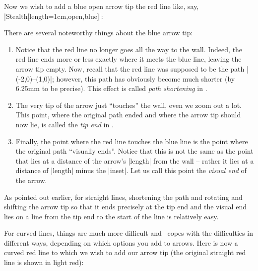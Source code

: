 Now we wish to add a blue open arrow tip the red line like, say,
|Stealth[length=1cm,open,blue]|:
%
\begin{codeexample}
\usetikzlibrary{patterns}
\def\wall{ \fill     [fill=black!50]  (1,-.5) rectangle (2,.5);
           \pattern  [pattern=bricks] (1,-.5) rectangle (2,.5);
           \draw     [line width=1pt]  (1cm+.5pt,-.5) -- ++(0,1); }
\end{codeexample}
\begin{codeexample}[]
\end{codeexample}

There are several noteworthy things about the blue arrow tip:
%
\begin{enumerate}
    \item Notice that the red line no longer goes all the way to the wall.
        Indeed, the red line ends more or less exactly where it meets the
        blue line, leaving the arrow tip empty. Now, recall that the red line
        was supposed to be the path |(-2,0)--(1,0)|; however, this path has
        obviously become much shorter (by 6.25mm to be precise). This effect
        is called \emph{path shortening} in \tikzname.
    \item The very tip of the arrow just ``touches'' the wall, even we zoom
        out a lot. This point, where the original path ended and where the
        arrow tip should now lie, is called the \emph{tip end} in \tikzname.
    \item Finally, the point where the red line touches the blue line is the
        point where the original path ``visually ends''. Notice that this is
        not the same as the point that lies at a distance of the arrow's
        |length| from the wall -- rather it lies at a distance of |length|
        minus the |inset|. Let us call this point the \emph{visual
    end} of the arrow.
\end{enumerate}

As pointed out earlier, for straight lines, shortening the path and rotating
and shifting the arrow tip so that it ends precisely at the tip end and the
visual end lies on a line from the tip end to the start of the line is
relatively easy.

For curved lines, things are much more difficult and \tikzname\ copes with the
difficulties in different ways, depending on which options you add to arrows.
Here is now a curved red line to which we wish to add our arrow tip (the
original straight red line is shown in light red):
%
\begin{codeexample}[]
\end{codeexample}

